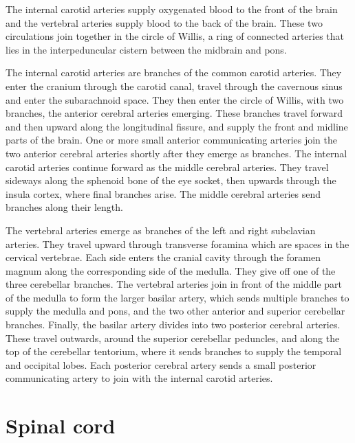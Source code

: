 \documentclass[]{book}
\begin{document}
The internal carotid arteries supply oxygenated blood to the front of the brain and the vertebral arteries supply blood to the back of the brain. These two circulations join together in the circle of Willis, a ring of connected arteries that lies in the interpeduncular cistern between the midbrain and pons.

The internal carotid arteries are branches of the common carotid arteries. They enter the cranium through the carotid canal, travel through the cavernous sinus and enter the subarachnoid space. They then enter the circle of Willis, with two branches, the anterior cerebral arteries emerging. These branches travel forward and then upward along the longitudinal fissure, and supply the front and midline parts of the brain. One or more small anterior communicating arteries join the two anterior cerebral arteries shortly after they emerge as branches. The internal carotid arteries continue forward as the middle cerebral arteries. They travel sideways along the sphenoid bone of the eye socket, then upwards through the insula cortex, where final branches arise. The middle cerebral arteries send branches along their length.

The vertebral arteries emerge as branches of the left and right subclavian arteries. They travel upward through transverse foramina which are spaces in the cervical vertebrae. Each side enters the cranial cavity through the foramen magnum along the corresponding side of the medulla. They give off one of the three cerebellar branches. The vertebral arteries join in front of the middle part of the medulla to form the larger basilar artery, which sends multiple branches to supply the medulla and pons, and the two other anterior and superior cerebellar branches. Finally, the basilar artery divides into two posterior cerebral arteries. These travel outwards, around the superior cerebellar peduncles, and along the top of the cerebellar tentorium, where it sends branches to supply the temporal and occipital lobes. Each posterior cerebral artery sends a small posterior communicating artery to join with the internal carotid arteries.

\hypertarget{spinal-cord}{%
\section{Spinal cord}\label{spinal-cord}}
\end{document}
